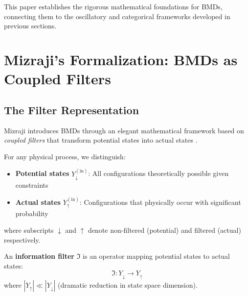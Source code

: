 This paper establishes the rigorous mathematical foundations for BMDs, connecting them to the oscillatory and categorical frameworks developed in previous sections.

\section{Mizraji's Formalization: BMDs as Coupled Filters}

\subsection{The Filter Representation}

Mizraji introduces BMDs through an elegant mathematical framework based on \textit{coupled filters} that transform potential states into actual states \cite{mizraji2021biological}.

\begin{definition}
\label{def:filtered_states}
For any physical process, we distinguish:
\begin{itemize}
\item \textbf{Potential states} $Y_{\downarrow}^{(\text{in})}$: All configurations theoretically possible given constraints
\item \textbf{Actual states} $Y_{\uparrow}^{(\text{in})}$: Configurations that physically occur with significant probability
\end{itemize}
where subscripts $\downarrow$ and $\uparrow$ denote non-filtered (potential) and filtered (actual) respectively.
\end{definition}

\begin{definition}
\label{def:info_filter}
An \textbf{information filter} $\Im$ is an operator mapping potential states to actual states:
\begin{equation}
\Im: Y_{\downarrow} \to Y_{\uparrow}
\end{equation}
where $|Y_{\uparrow}| \ll |Y_{\downarrow}|$ (dramatic reduction in state space dimension).
\end{definition}

